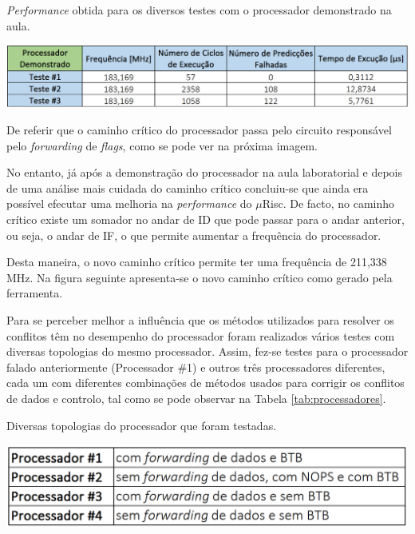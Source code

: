 \documentclass[11pt]{article}
\numberwithin{equation}{section}
\begin{document}
\begin{table}[H]
	\centering
	\caption{\textit{Performance} obtida para os diversos testes com o processador demonstrado na aula.}
	\vspace{-1.5mm}
	\includegraphics[keepaspectratio=true, scale=0.40]{tabelas/processadororiginal}
	\label{tab:processadororiginal}
\end{table}

De referir que o caminho crítico do processador passa pelo circuito responsável pelo \textit{forwarding} de \textit{flags}, como se pode ver na próxima imagem.


No entanto, já após a demonstração do processador na aula laboratorial e depois de uma análise mais cuidada do caminho crítico concluiu-se que ainda era possível efecutar uma melhoria na \textit{performance} do $\mu$Risc. De facto, no caminho crítico existe um somador no andar de ID que pode passar para o andar anterior, ou seja, o andar de IF, o que permite aumentar a frequência do processador. 

Desta maneira, o novo caminho crítico permite ter uma frequência de 211,338 MHz. Na figura seguinte apresenta-se o novo caminho crítico como gerado pela ferramenta.


Para se perceber melhor a influência que os métodos utilizados para resolver os conflitos têm no desempenho do processador foram realizados vários testes com diversas topologias do mesmo processador. Assim, fez-se testes para o processador falado anteriormente (Processador \#1) e outros três processadores diferentes, cada um com diferentes combinações de métodos usados para corrigir os conflitos de dados e controlo, tal como se pode observar na Tabela \ref{tab:processadores}.

\begin{table}[H]
	\centering
	\caption{Diversas topologias do processador que foram testadas.}
	\vspace{-1.5mm}
	\includegraphics[keepaspectratio=true, scale=0.40]{tabelas/processadores}
	\label{tab:processadores}
\end{table}
\end{document}
